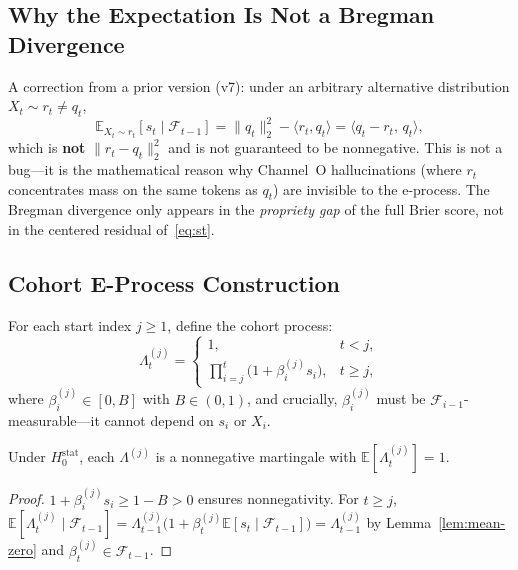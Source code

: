 \documentclass[runningheads]{llncs}
\newcommand{\Hnull}{H_0^{\text{stat}}}
\begin{document}
\subsection{Why the Expectation Is Not a Bregman Divergence}

A correction from a prior version (v7): under an arbitrary alternative
distribution $X_t \sim r_t \neq q_t$,
\begin{equation}\label{eq:expectation-r}
\mathbb{E}_{X_t \sim r_t}[s_t \mid \mathcal{F}_{t-1}]
    = \|q_t\|_2^2 - \langle r_t, q_t \rangle
    = \langle q_t - r_t,\, q_t \rangle,
\end{equation}
which is \textbf{not} $\|r_t - q_t\|_2^2$ and is not guaranteed to be
nonnegative. This is not a bug---it is the mathematical reason why
Channel~O hallucinations (where $r_t$ concentrates mass on the same tokens as
$q_t$) are invisible to the e-process. The Bregman divergence only appears in
the \textit{propriety gap} of the full Brier score, not in the centered
residual of~\eqref{eq:st}.

\subsection{Cohort E-Process Construction}

For each start index $j \ge 1$, define the cohort process:
\begin{equation}\label{eq:cohort}
\Lambda_t^{(j)} =
\begin{cases}
1, & t < j, \\[6pt]
\displaystyle\prod_{i=j}^{t} \bigl(1 + \beta_i^{(j)} s_i\bigr), & t \ge j,
\end{cases}
\end{equation}
where $\beta_i^{(j)} \in [0, B]$ with $B \in (0, 1)$, and crucially,
$\beta_i^{(j)}$ must be $\mathcal{F}_{i-1}$-measurable---it cannot depend on
$s_i$ or $X_i$.

\begin{lemma}\label{lem:cohort-martingale}
Under $\Hnull$, each $\Lambda^{(j)}$ is a nonnegative martingale with
$\mathbb{E}[\Lambda_t^{(j)}] = 1$.
\end{lemma}

\begin{proof}
$1 + \beta_i^{(j)} s_i \ge 1 - B > 0$ ensures nonnegativity. For $t \ge j$,
$\mathbb{E}[\Lambda_t^{(j)} \mid \mathcal{F}_{t-1}]
 = \Lambda_{t-1}^{(j)}\bigl(1 + \beta_t^{(j)}\mathbb{E}[s_t \mid
   \mathcal{F}_{t-1}]\bigr)
 = \Lambda_{t-1}^{(j)}$ by Lemma~\ref{lem:mean-zero} and
$\beta_t^{(j)} \in \mathcal{F}_{t-1}$.
\end{proof}
\end{document}
